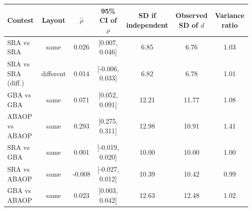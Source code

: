 \begin{tabular}{|l|c|c|c|c|c|c|}
\hline
\rowcolor{aliceblue}
Contest & Layout & $\hat\rho$ & 95\% CI of $\rho$ & SD if independent & Observed SD of $d$ & Variance ratio \\ \hline
SRA vs SRA & same & 0.026 & [0.007, 0.046] & 6.85 & 6.76 & 1.03 \\ \hline
SRA vs SRA (diff.) & different & 0.014 & [-0.006, 0.033] & 6.82 & 6.78 & 1.01 \\ \hline
GBA vs GBA & same & 0.071 & [0.052, 0.091] & 12.21 & 11.77 & 1.08 \\ \hline
ABAOP vs ABAOP & same & 0.293 & [0.275, 0.311] & 12.98 & 10.91 & 1.41 \\ \hline
SRA vs GBA & same & 0.001 & [-0.019, 0.020] & 10.00 & 10.00 & 1.00 \\ \hline
SRA vs ABAOP & same & -0.008 & [-0.027, 0.012] & 10.39 & 10.42 & 0.99 \\ \hline
GBA vs ABAOP & same & 0.023 & [0.003, 0.042] & 12.63 & 12.48 & 1.02 \\ \hline
\end{tabular}
